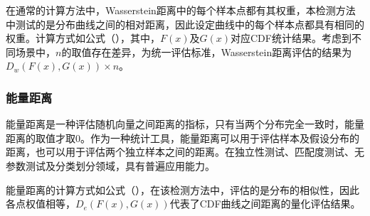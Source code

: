 在通常的计算方法中，Wasserstein距离中的每个样本点都有其权重，本检测方法中测试的是分布曲线之间的相对距离，因此设定曲线中的每个样本点都具有相同的权重。计算方式如公式（），其中，$F(x)$及$G(x)$对应CDF统计结果。考虑到不同场景中，$n$的取值存在差异，为统一评估标准，Wasserstein距离评估的结果为$D_{w}(F(x),G(x))\times n$。

\subsubsection{能量距离}
\label{chap:analyze:statistical:distance:energy}

能量距离是一种评估随机向量之间距离的指标，只有当两个分布完全一致时，能量距离的取值才取0。作为一种统计工具，能量距离可以用于评估样本及假设分布的距离，也可以用于评估两个独立样本之间的距离。在独立性测试、匹配度测试、无参数测试及分类划分领域，具有普遍应用能力。


能量距离的计算方式如公式（），在该检测方法中，评估的是分布的相似性，因此各点权值相等，$D_{e}(F(x),G(x))$代表了CDF曲线之间距离的量化评估结果。


